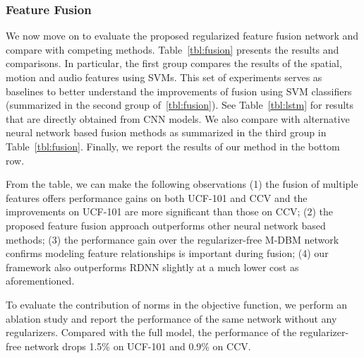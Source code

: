 \documentclass[journal]{IEEEtran}
\begin{document}
\subsubsection{Feature Fusion}
We now move on to evaluate the proposed regularized feature fusion network and compare with competing methods. Table~\ref{tbl:fusion} presents the results and comparisons. In particular, the first group compares the results of the spatial, motion and audio features using SVMs. This set of experiments serves as baselines to better understand the improvements of fusion using SVM classifiers (summarized in the second group of~\ref{tbl:fusion}). See Table~\ref{tbl:lstm} for results that are directly obtained from CNN models. We also compare with alternative neural network based fusion methods as summarized in the third group in Table~\ref{tbl:fusion}.
Finally, we report the results of our method in the bottom row.

From the table, we can make the following observations (1) the fusion of multiple features offers performance gains on both UCF-101 and CCV and the improvements on UCF-101 are more significant than those on CCV; (2) the proposed feature fusion approach outperforms other neural network based methods; (3) the performance gain over the regularizer-free M-DBM network confirms modeling feature relationships is important during fusion; (4) our framework also outperforms RDNN slightly at a much lower cost as aforementioned.

To evaluate the contribution of norms in the objective function, we perform an ablation study and report the performance of the same network without any regularizers. Compared with the full model, the performance of the regularizer-free network drops 1.5\% on UCF-101 and 0.9\% on CCV.

\end{document}
